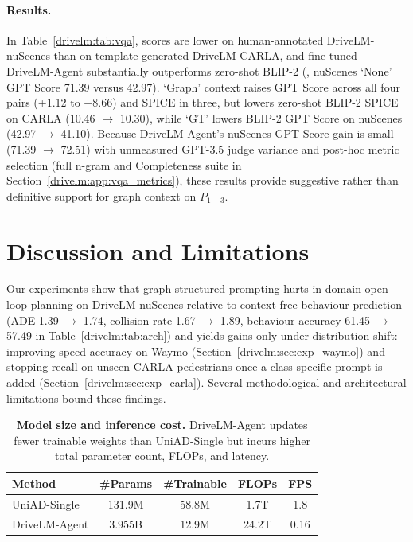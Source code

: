 \paragraph{Results.}
In Table~\ref{drivelm:tab:vqa}, scores are lower on human-annotated DriveLM-nuScenes than on template-generated DriveLM-CARLA, and fine-tuned DriveLM-Agent substantially outperforms zero-shot BLIP-2 (\eg, nuScenes `None' GPT Score 71.39 versus 42.97). `Graph' context raises GPT Score across all four pairs (+1.12 to +8.66) and SPICE in three, but lowers zero-shot BLIP-2 SPICE on CARLA (10.46 $\rightarrow$ 10.30), while `GT' lowers BLIP-2 GPT Score on nuScenes (42.97 $\rightarrow$ 41.10). Because DriveLM-Agent's nuScenes GPT Score gain is small (71.39 $\rightarrow$ 72.51) with unmeasured GPT-3.5 judge variance and post-hoc metric selection (full n-gram and Completeness suite in Section~\ref{drivelm:app:vqa_metrics}), these results provide suggestive rather than definitive support for graph context on $P_{1-3}$.

\section{Discussion and Limitations}\label{drivelm:sec:discussion}

Our experiments show that graph-structured prompting hurts in-domain open-loop planning on DriveLM-nuScenes relative to context-free behaviour prediction (ADE 1.39 $\rightarrow$ 1.74, collision rate 1.67 $\rightarrow$ 1.89, behaviour accuracy 61.45 $\rightarrow$ 57.49 in Table~\ref{drivelm:tab:arch}) and yields gains only under distribution shift: improving speed accuracy on Waymo (Section~\ref{drivelm:sec:exp_waymo}) and stopping recall on unseen CARLA pedestrians once a class-specific prompt is added (Section~\ref{drivelm:sec:exp_carla}). Several methodological and architectural limitations bound these findings.

\begin{table}[t]
  \centering
  \caption[Model size and inference cost]{\textbf{Model size and inference cost.} DriveLM-Agent updates fewer trainable weights than UniAD-Single but incurs higher total parameter count, FLOPs, and latency.}
  \label{drivelm:tab:latency}
  \begin{tabular}{lcccc}
    \toprule
    Method & \#Params & \#Trainable & FLOPs & FPS \\
    \midrule
    UniAD-Single & 131.9M & 58.8M & 1.7T & 1.8 \\
    \rowcolor[gray]{0.9} DriveLM-Agent & 3.955B & 12.9M & 24.2T & 0.16 \\
    \bottomrule
  \end{tabular}
\end{table}

